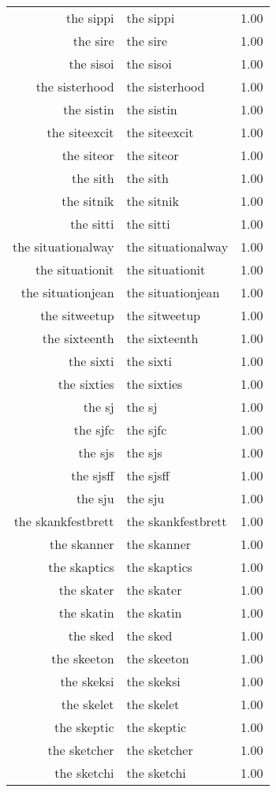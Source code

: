 \begin{table}[ht]
\begin{tabular}{rlr}
  the sippi & the sippi & 1.00 \\ 
  the sire & the sire & 1.00 \\ 
  the sisoi & the sisoi & 1.00 \\ 
  the sisterhood & the sisterhood & 1.00 \\ 
  the sistin & the sistin & 1.00 \\ 
  the siteexcit & the siteexcit & 1.00 \\ 
  the siteor & the siteor & 1.00 \\ 
  the sith & the sith & 1.00 \\ 
  the sitnik & the sitnik & 1.00 \\ 
  the sitti & the sitti & 1.00 \\ 
  the situationalway & the situationalway & 1.00 \\ 
  the situationit & the situationit & 1.00 \\ 
  the situationjean & the situationjean & 1.00 \\ 
  the sitweetup & the sitweetup & 1.00 \\ 
  the sixteenth & the sixteenth & 1.00 \\ 
  the sixti & the sixti & 1.00 \\ 
  the sixties & the sixties & 1.00 \\ 
  the sj & the sj & 1.00 \\ 
  the sjfc & the sjfc & 1.00 \\ 
  the sjs & the sjs & 1.00 \\ 
  the sjsff & the sjsff & 1.00 \\ 
  the sju & the sju & 1.00 \\ 
  the skankfestbrett & the skankfestbrett & 1.00 \\ 
  the skanner & the skanner & 1.00 \\ 
  the skaptics & the skaptics & 1.00 \\ 
  the skater & the skater & 1.00 \\ 
  the skatin & the skatin & 1.00 \\ 
  the sked & the sked & 1.00 \\ 
  the skeeton & the skeeton & 1.00 \\ 
  the skeksi & the skeksi & 1.00 \\ 
  the skelet & the skelet & 1.00 \\ 
  the skeptic & the skeptic & 1.00 \\ 
  the sketcher & the sketcher & 1.00 \\ 
  the sketchi & the sketchi & 1.00 \\ 

\end{tabular}
\end{table}
